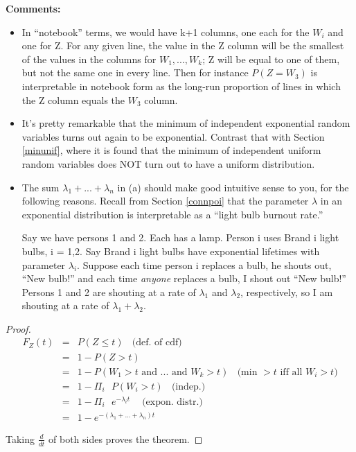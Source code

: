 {\bf Comments:}

\begin{itemize}

\item In ``notebook'' terms, we would have k+1 columns, one each for the
$W_i$ and one for Z.  For any given line, the value in the Z column will
be the smallest of the values in the columns for $W_1,...,W_k$; Z will
be equal to one of them, but not the same one in every line.  Then for
instance $P(Z = W_3)$ is interpretable in notebook form as the long-run
proportion of lines in which the Z column equals the $W_3$ column.

\item It's pretty remarkable that the minimum of independent exponential
random variables turns out again to be exponential.  Contrast that with
Section \ref{minunif}, where it is found that the minimum of independent
uniform random variables does NOT turn out to have a uniform
distribution.

\item The sum $\lambda_1+...+\lambda_n$ in (a) should make good
intuitive sense to you, for the following reasons.  Recall from Section
\ref{connpoi} that the parameter $\lambda$ in an exponential
distribution is interpretable as a ``light bulb burnout rate.''

Say we have persons 1 and 2.  Each has a lamp.  Person i uses Brand i
light bulbs, i = 1,2.  Say Brand i light bulbs have exponential
lifetimes with parameter $\lambda_i$.  Suppose each time person i
replaces a bulb, he shouts out, ``New bulb!'' and each time {\it anyone}
replaces a bulb, I shout out ``New bulb!'' Persons 1 and 2 are shouting
at a rate of $\lambda_1$ and $\lambda_2$, respectively, so I am shouting
at a rate of $\lambda_1 + \lambda_2$.

\end{itemize}

\begin{proof}

\begin{eqnarray}
F_{Z}(t) &=& P(Z \leq t) ~~~~ \textrm{(def. of cdf) }\\
&=& 1-P(Z>t) \\
&=& 1-P(W_{1}>t\textrm{ and }...\textrm{ and }W_{k}>t)  ~~~~
\textrm{(min $> t$ iff all $W_i > t$)} \\
&=& 1-\Pi_{i}\textrm{ } P(W_i > t)  ~~~~ \textrm{(indep.) }\\
&=& 1-\Pi_{i}\textrm{ }e^{-\lambda_{i}t} ~~~~ \textrm{ (expon. distr.)} \\
&=& 1 - e^{-(\lambda_1+...+\lambda_n) t}
\end{eqnarray}

Taking $\frac{d}{dt}$ of both sides proves the theorem.

\end{proof}

